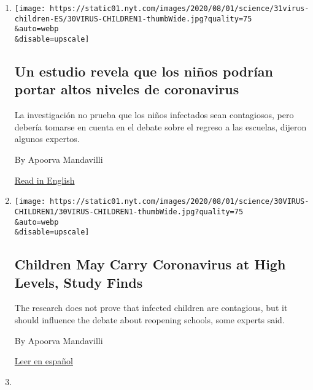 \begin{enumerate}
\def\labelenumi{\arabic{enumi}.}
\item
  \href{/es/2020/07/31/espanol/ciencia-y-tecnologia/ninos-contagio-coronavirus.html}{}

  \texttt{[image: https://static01.nyt.com/images/2020/08/01/science/31virus-children-ES/30VIRUS-CHILDREN1-thumbWide.jpg?quality=75\\\&auto=webp\\\&disable=upscale]}

  \hypertarget{un-estudio-revela-que-los-niuxf1os-podruxedan-portar-altos-niveles-de-coronavirus}{%
  \subsection{Un estudio revela que los niños podrían portar altos
  niveles de
  coronavirus}\label{un-estudio-revela-que-los-niuxf1os-podruxedan-portar-altos-niveles-de-coronavirus}}

  La investigación no prueba que los niños infectados sean contagiosos,
  pero debería tomarse en cuenta en el debate sobre el regreso a las
  escuelas, dijeron algunos expertos.

  By Apoorva Mandavilli

  \href{https://www.nytimes.com/2020/07/30/health/coronavirus-children.html}{Read
  in English}
\item
  \href{/2020/07/30/health/coronavirus-children.html}{}

  \texttt{[image: https://static01.nyt.com/images/2020/08/01/science/30VIRUS-CHILDREN1/30VIRUS-CHILDREN1-thumbWide.jpg?quality=75\\\&auto=webp\\\&disable=upscale]}

  \hypertarget{children-may-carry-coronavirus-at-high-levels-study-finds}{%
  \subsection{Children May Carry Coronavirus at High Levels, Study
  Finds}\label{children-may-carry-coronavirus-at-high-levels-study-finds}}

  The research does not prove that infected children are contagious, but
  it should influence the debate about reopening schools, some experts
  said.

  By Apoorva Mandavilli

  \href{https://www.nytimes.com/es/2020/07/31/espanol/ciencia-y-tecnologia/ninos-contagio-coronavirus.html}{Leer
  en español}
\item
  \href{/es/2020/07/28/espanol/ciencia-y-tecnologia/anticuerpos-coronavirus-inmunidad.html}{}


\end{enumerate}
